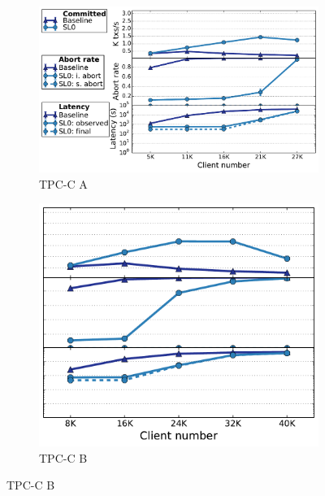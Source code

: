 \begin{figure}
\centering
\begin{minipage}{.73\textwidth}
\hspace{-5mm}
\begin{subfigure}[t]{0.3\linewidth}
\def\svgwidth{0.95\columnwidth}
\includegraphics[scale = 0.23]{figures/tpcc583warehouse}
\caption{\scriptsize  TPC-C A}
\label{fig:tpcc:a}
\end{subfigure}
\hspace{14mm}
\begin{subfigure}[t]{0.3\linewidth}
\def\svgwidth{0.95\columnwidth}
\includegraphics[scale = 0.23]{figures/tpcc543warehouse}
\caption{\scriptsize TPC-C B}
\label{fig:tpcc:b}

\end{subfigure}
\end{minipage}
\end{figure}

